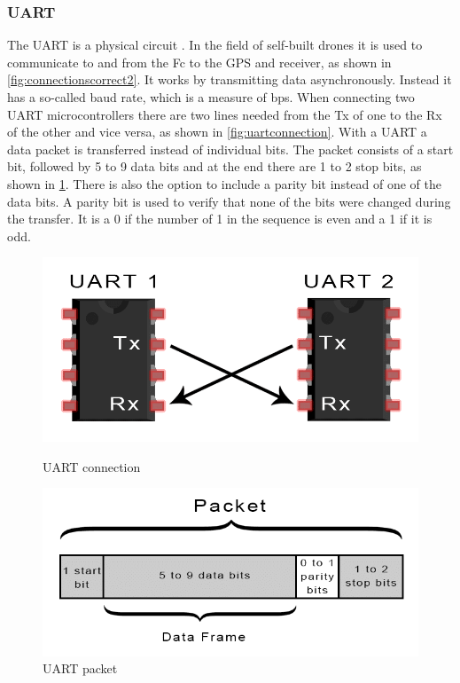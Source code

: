 \documentclass[svgnames]{article}
\begin{document}
	\subsubsection{UART}
	The \gls{UART} is a physical circuit \cite{uartprotocol}. In the field of self-built drones it is used to communicate to and from the \gls{Fc} to the \gls{GPS} and receiver, as shown in \cref{fig:connectionscorrect2}. It works by transmitting data asynchronously. Instead it has a so-called baud rate, which is a measure of \gls{bps}. When connecting two \gls{UART} microcontrollers there are two lines needed from the Tx of one to the Rx of the other and vice versa, as shown in \cref{fig:uartconnection}. With a \gls{UART} a data packet is transferred instead of individual bits. The packet consists of a start bit, followed by 5 to 9 data bits and at the end there are 1 to 2 stop bits, as shown in \cref{fig:uartpackage}. There is also the option to include a parity bit instead of one of the data bits. A parity bit is used to verify that none of the bits were changed during the transfer. It is a 0 if the number of 1 in the sequence is even and a 1 if it is odd.
\begin{figure}[ht]
	\begin{minipage}[c]{0.4\textwidth}
		\includegraphics[width=\textwidth]{pictures/UARTconnection}
		\caption{\gls{UART} connection \cite{uartprotocol}}
		\label{fig:uartconnection}
	\end{minipage}
	\hfill
	\begin{minipage}[c]{0.4\textwidth}
		\includegraphics[width=\textwidth]{pictures/Uartpackage}
		\caption{\gls{UART} packet \cite{uartprotocol}}
		\label{fig:uartpackage}
	\end{minipage}
	
\end{figure}
\end{document}

